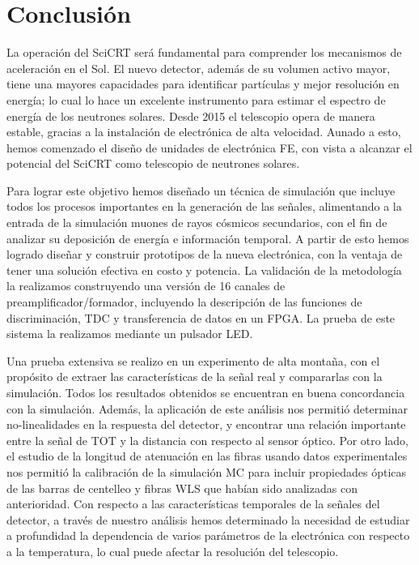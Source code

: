 
\chapter{Conclusión}

La operación del SciCRT será fundamental para comprender los mecanismos de aceleración en el Sol. El nuevo detector, además de su volumen activo mayor, tiene una mayores capacidades para identificar partículas y mejor resolución en energía; lo cual lo hace un excelente instrumento para estimar el espectro de energía de los neutrones solares. Desde \num{2015} el telescopio opera de manera estable, gracias a la instalación de electrónica de alta velocidad. Aunado a esto, hemos comenzado el diseño de unidades de electrónica FE, con vista a alcanzar el potencial del SciCRT como telescopio de neutrones solares.

Para lograr este objetivo hemos diseñado un técnica de simulación que incluye todos los procesos importantes en la generación de las señales, alimentando a la entrada de la simulación muones de rayos cósmicos secundarios, con el fin de analizar su deposición de energía e información temporal. A partir de esto hemos logrado diseñar y construir prototipos de la nueva electrónica, con la ventaja de tener una solución efectiva en costo y potencia. La validación de la metodología la realizamos construyendo una versión de \num{16} canales de preamplificador/formador, incluyendo la descripción de las funciones de discriminación, TDC y transferencia de datos en un FPGA. La prueba de este sistema la realizamos mediante un pulsador LED.

Una prueba extensiva se realizo en un experimento de alta montaña, con el propósito de extraer las características de la señal real y compararlas con la simulación. Todos los resultados obtenidos se encuentran en buena concordancia con la simulación. Además, la aplicación de este análisis nos permitió determinar no-linealidades en la respuesta del detector, y encontrar una relación importante entre la señal de TOT y la distancia con respecto al sensor óptico. Por otro lado, el estudio de la longitud de atenuación en las fibras usando datos experimentales nos permitió la calibración de la simulación MC para incluir propiedades ópticas de las barras de centelleo y fibras WLS que habían sido analizadas con anterioridad. Con respecto a las características temporales de la señales del detector, a través de nuestro análisis hemos determinado la necesidad de estudiar a profundidad la dependencia de varios parámetros de la electrónica con respecto a la temperatura, lo cual puede afectar la resolución del telescopio.


